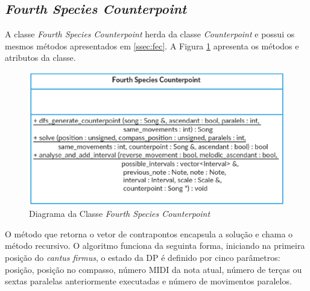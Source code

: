     \subsection[\textit{Fourth Species Counterpoint}]{\textit{Fourth Species Counterpoint}}

    A classe \textit{Fourth Species Counterpoint} herda da classe \textit{Counterpoint} e possui os mesmos métodos apresentados em \ref{ssec:fec}. A Figura \ref{fourthspeciescounterpointclass} apresenta os métodos e atributos da classe.

    \begin{figure}[htb]
      \centering
      \includegraphics[scale=0.7]{figuras/fourthspeciescounterpointclass.eps}
      \caption{Diagrama da Classe \textit{Fourth Species Counterpoint}}
      \label{fourthspeciescounterpointclass}
    \end{figure}

    O método que retorna o vetor de contrapontos encapsula a solução e chama o método recursivo. O algoritmo funciona da seguinta forma, iniciando na primeira posição do \textit{cantus firmus}, o estado da DP é definido por cinco parâmetros: posição, posição no compasso, número MIDI da nota atual, número de terças ou sextas paralelas anteriormente executadas e número de movimentos paralelos.

